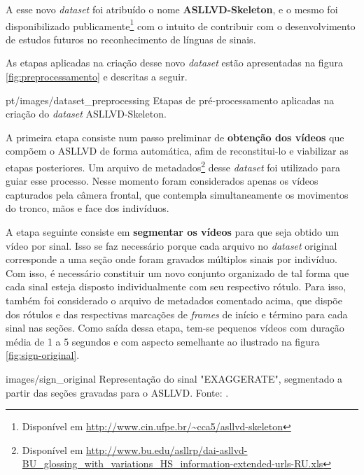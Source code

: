 A esse novo \textit{dataset} foi atribuído o nome \textbf{ASLLVD-Skeleton}, e o mesmo foi disponibilizado publicamente\footnote{
    Disponível em \url{http://www.cin.ufpe.br/~cca5/asllvd-skeleton}
} com o intuito de contribuir com o desenvolvimento de estudos futuros no reconhecimento de línguas de sinais.

As etapas aplicadas na criação desse novo \textit{dataset} estão apresentadas na figura \ref{fig:preprocessamento} e descritas a seguir.

    {pt/images/dataset_preprocessing}
    {Etapas de pré-processamento aplicadas na criação do \textit{dataset} ASLLVD-Skeleton.}

A primeira etapa consiste num passo preliminar de \textbf{obtenção dos vídeos} que compõem o ASLLVD de forma automática, afim de reconstitui-lo e viabilizar as etapas posteriores. Um arquivo de metadados\footnote{
    Disponível em \url{http://www.bu.edu/asllrp/dai-asllvd-BU_glossing_with_variations_HS_information-extended-urls-RU.xls}
} desse \textit{dataset} foi utilizado para guiar esse processo. Nesse momento foram considerados apenas os vídeos capturados pela câmera frontal, que contempla simultaneamente os movimentos do tronco, mãos e face dos indivíduos.

A etapa seguinte consiste em \textbf{segmentar os vídeos} para que seja obtido um vídeo por sinal. Isso se faz necessário porque cada arquivo no \textit{dataset} original corresponde a uma seção onde foram gravados múltiplos sinais por indivíduo. Com isso, é necessário constituir um novo conjunto organizado de tal forma que cada sinal esteja disposto individualmente com seu respectivo rótulo. Para isso, também foi considerado o arquivo de metadados comentado acima, que dispõe dos rótulos e das respectivas marcações de \textit{frames} de início e término para cada sinal nas seções. Como saída dessa etapa, tem-se pequenos vídeos com duração média de 1 a 5 segundos e com aspecto semelhante ao ilustrado na figura \ref{fig:sign-original}.

    {images/sign_original}
    {Representação do sinal "EXAGGERATE", segmentado a partir das seções gravadas para o ASLLVD. Fonte: \cite{athitsos-asllvd-2008}.}


